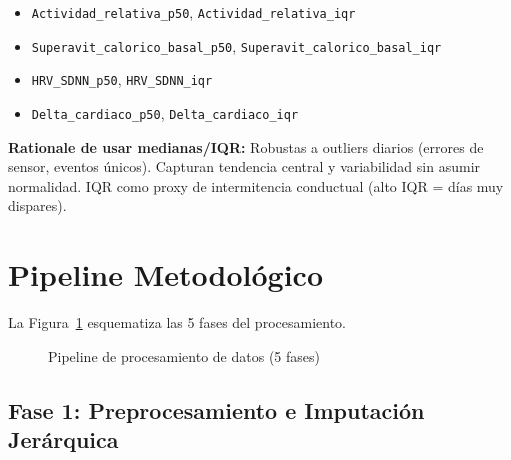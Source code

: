 \documentclass[12pt,a4paper,twoside]{article}
\begin{document}
\begin{itemize}[itemsep=0pt]
    \item \texttt{Actividad\_relativa\_p50}, \texttt{Actividad\_relativa\_iqr}
    \item \texttt{Superavit\_calorico\_basal\_p50}, \texttt{Superavit\_calorico\_basal\_iqr}
    \item \texttt{HRV\_SDNN\_p50}, \texttt{HRV\_SDNN\_iqr}
    \item \texttt{Delta\_cardiaco\_p50}, \texttt{Delta\_cardiaco\_iqr}
\end{itemize}

\textbf{Rationale de usar medianas/IQR:} Robustas a outliers diarios (errores de sensor, eventos únicos). Capturan tendencia central y variabilidad sin asumir normalidad. IQR como proxy de intermitencia conductual (alto IQR = días muy dispares).


\section{Pipeline Metodológico}

La Figura~\ref{fig:pipeline} esquematiza las 5 fases del procesamiento.

\begin{figure}[h]
\centering
{}
\caption{Pipeline de procesamiento de datos (5 fases)}
\label{fig:pipeline}
\end{figure}

\subsection{Fase 1: Preprocesamiento e Imputación Jerárquica}
\end{document}
